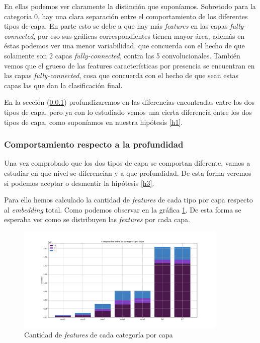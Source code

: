 \documentclass[12,twoside]{TFG-GM}
\theoremstyle{definition}
\theoremstyle{remark}
\begin{document}
En ellas podemos ver claramente la distinción que suponíamos. Sobretodo para la categoría 0, hay una clara separación entre el comportamiento de los diferentes tipos de capa. En parte esto se debe a que hay más \textit{features} en las capas \textit{fully-connected}, por eso sus gráficas correspondientes tienen mayor área, además en éstas podemos ver una menor variabilidad, que concuerda con el hecho de que solamente son 2 capas \textit{fully-connected}, contra las 5 convolucionales. También vemos que el grueso de las features características por presencia se encuentran en las capas \textit{fully-connected}, cosa que concuerda con el hecho de que sean estas capas las que dan la clasificación final. 


En la sección (\ref{subsec:distribucionporcapa}) profundizaremos en las diferencias encontradas entre los dos tipos de capa, pero ya con lo estudiado vemos una cierta diferencia entre los dos tipos de capa, como suponíamos en nuestra hipótesis \ref{h1}. 

\subsubsection{Comportamiento respecto a la profundidad}\label{subsec:distribucionporcapa}

Una vez comprobado que los dos tipos de capa se comportan diferente, vamos a estudiar en que nivel se diferencian y a que profundidad. De esta forma veremos si podemos aceptar o desmentir la hipótesis \ref{h3}. 

Para ello hemos calculado la cantidad de \textit{features} de cada tipo por capa respecto al \textit{embedding} total. Como podemos observar en la gráfica \ref{fig:totalfeaturesperlayer}. De esta forma se esperaba ver como se distribuyen las \textit{features} por cada capa.



\begin{figure}[ht] 
	\centering
	\includegraphics[width=0.9\textwidth] {Images/plots/25/Comparative_of_synsets_all.png}
	\caption{ Cantidad de \textit{features} de cada categoría por capa
	\label{fig:totalfeaturesperlayer}}
\end{figure}
\end{document}
